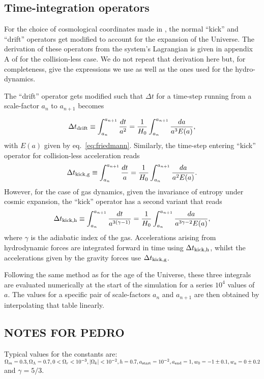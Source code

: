 \subsection{Time-integration operators}
For the choice of cosmological coordinates made in \swift, the normal
``kick'' and ``drift'' operators get modified to account for the
expansion of the Universe. The derivation of these operators from the
system's Lagrangian is given in appendix A of \cite{Quinn1997} for the
collision-less case. We do not repeat that derivation here but, for
completeness, give the expressions we use as well as the ones used for
the hydro-dynamics. 

The ``drift'' operator gets modified such that $\Delta t$ for a
time-step running from a scale-factor $a_{n}$ to $a_{n+1}$ becomes

\begin{equation}
  \Delta t_{\rm drift} \equiv \int_{a_n}^{a_{n+1}} \frac{dt}{a^2} = \frac{1}{H_0} \int_{a_n}^{a_{n+1}} \frac{da}{a^3E(a)},
\end{equation}
with $E(a)$ given by eq.~\ref{eq:friedmann}. Similarly, the time-step
entering ``kick'' operator for collision-less acceleration reads
\begin{equation}
  \Delta t_{\rm kick,g} \equiv \int_{a_n}^{a_{n+1}} \frac{dt}{a} = \frac{1}{H_0} \int_{a_n}^{a_{n+1}} \frac{da}{a^2E(a)}.
\end{equation}
However, for the case of gas dynamics, given the invariance of entropy
under cosmic expansion, the ``kick'' operator has a second variant
that reads
\begin{equation}
  \Delta t_{\rm kick,h} \equiv \int_{a_n}^{a_{n+1}} \frac{dt}{a^{3(\gamma-1)}} = \frac{1}{H_0} \int_{a_n}^{a_{n+1}} \frac{da}{a^{3\gamma - 2}E(a)},
\end{equation}
where $\gamma$ is the adiabatic index of the gas.  Accelerations
arising from hydrodynamic forces are integrated forward in time using
$\Delta t_{\rm kick,h}$, whilst the accelerations given by the gravity
forces use $\Delta t_{\rm kick,g}$.

Following the same method as for the age of the Universe, these three
integrals are evaluated numerically at the start of the simulation for
a series $10^4$ values of $a$. The values for a specific pair of
scale-factors $a_n$ and $a_{n+1}$ are then obtained by interpolating
that table linearly.



\subsection{NOTES FOR PEDRO}

Typical values for the constants are:
$\Omega_m = 0.3, \Omega_\Lambda=0.7, 0 < \Omega_r<10^{-3}, |\Omega_k | < 10^{-2}, h=0.7, a_{\rm start} = 10^{-2}, a_{\rm end} = 1, w_0 = -1\pm 0.1, w_a=0\pm0.2$ and $\gamma = 5/3$.

